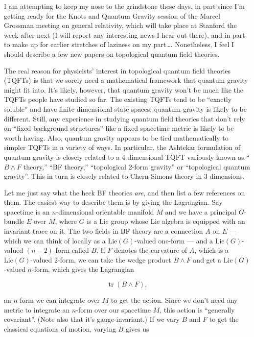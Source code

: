 \documentclass{article}
\begin{document}
I am attempting to keep my nose to the grindstone these days, in part
since I'm getting ready for the Knots and Quantum Gravity session of the
Marcel Grossman meeting on general relativity, which will take place at
Stanford the week after next (I will report any interesting news I hear
out there), and in part to make up for earlier stretches of laziness on
my part\ldots. Nonetheless, I feel I should describe a few new papers on
topological quantum field theories.

The real reason for physicists' interest in topological quantum field
theories (TQFTs) is that we sorely need a mathematical framework that
quantum gravity might fit into. It's likely, however, that quantum
gravity won't be much like the TQFTs people have studied so far. The
existing TQFTs tend to be ``exactly soluble'' and have
finite-dimensional state spaces; quantum gravity is likely to be
different. Still, any experience in studying quantum field theories that
don't rely on ``fixed background structures'' like a fixed spacetime
metric is likely to be worth having. Also, quantum gravity appears to be
tied mathematically to simpler TQFTs in a variety of ways. In
particular, the Ashtekar formulation of quantum gravity is closely
related to a 4-dimensional TQFT variously known as ``\(B \wedge F\)
theory,'' ``BF theory,'' ``topological 2-form gravity'' or ``topological
quantum gravity''. This in turn is closely related to Chern-Simons
theory in 3 dimensions.

Let me just say what the heck BF theories \emph{are}, and then list a
few references on them. The easiest way to describe them is by giving
the Lagrangian. Say spacetime is an \(n\)-dimensional orientable
manifold \(M\) and we have a principal \(G\)-bundle \(E\) over \(M\),
where \(G\) is a Lie group whose Lie algebra is equipped with an
invariant trace on it. The two fields in BF theory are a connection
\(A\) on \(E\) --- which we can think of locally as a
\(\mathrm{Lie}(G)\)-valued one-form --- and a \(\mathrm{Lie}(G)\)-valued
\((n-2)\)-form called \(B\). If \(F\) denotes the curvature of \(A\),
which is a \(\mathrm{Lie}(G)\)-valued 2-form, we can take the wedge
product \(B\wedge F\) and get a \(\mathrm{Lie}(G)\)-valued \(n\)-form,
which gives the Lagrangian

\[\operatorname{tr}(B \wedge F),\]

an \(n\)-form we can integrate over \(M\) to get the action. Since we
don't need any metric to integrate an \(n\)-form over our spacetime
\(M\), this action is ``generally covariant''. (Note also that it's
gauge-invariant.) If we vary \(B\) and \(F\) to get the classical
equations of motion, varying \(B\) gives us
\end{document}
